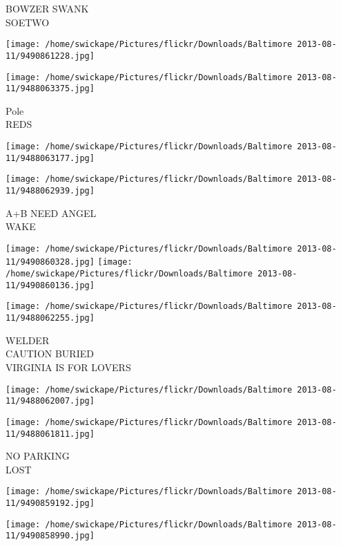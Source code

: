 \documentclass[10pt,letterpaper]{article}
\begin{document}
BOWZER SWANK\\
SOETWO\\
\pagebreak

\texttt{[image: /home/swickape/Pictures/flickr/Downloads/Baltimore 2013-08-11/9490861228.jpg]}

\vspace{0.25in}
\texttt{[image: /home/swickape/Pictures/flickr/Downloads/Baltimore 2013-08-11/9488063375.jpg]}

Pole\\
REDS\\
\pagebreak

\texttt{[image: /home/swickape/Pictures/flickr/Downloads/Baltimore 2013-08-11/9488063177.jpg]}

\vspace{0.25in}
\texttt{[image: /home/swickape/Pictures/flickr/Downloads/Baltimore 2013-08-11/9488062939.jpg]}

A+B NEED ANGEL\\
WAKE\\
\pagebreak

\texttt{[image: /home/swickape/Pictures/flickr/Downloads/Baltimore 2013-08-11/9490860328.jpg]}
\texttt{[image: /home/swickape/Pictures/flickr/Downloads/Baltimore 2013-08-11/9490860136.jpg]}

\texttt{[image: /home/swickape/Pictures/flickr/Downloads/Baltimore 2013-08-11/9488062255.jpg]}

WELDER\\
CAUTION BURIED\\
VIRGINIA IS FOR LOVERS\\
\pagebreak

\texttt{[image: /home/swickape/Pictures/flickr/Downloads/Baltimore 2013-08-11/9488062007.jpg]}

\vspace{0.25in}
\texttt{[image: /home/swickape/Pictures/flickr/Downloads/Baltimore 2013-08-11/9488061811.jpg]}

NO PARKING\\
LOST\\
\pagebreak

\texttt{[image: /home/swickape/Pictures/flickr/Downloads/Baltimore 2013-08-11/9490859192.jpg]}

\vspace{0.25in}
\texttt{[image: /home/swickape/Pictures/flickr/Downloads/Baltimore 2013-08-11/9490858990.jpg]}
\end{document}
